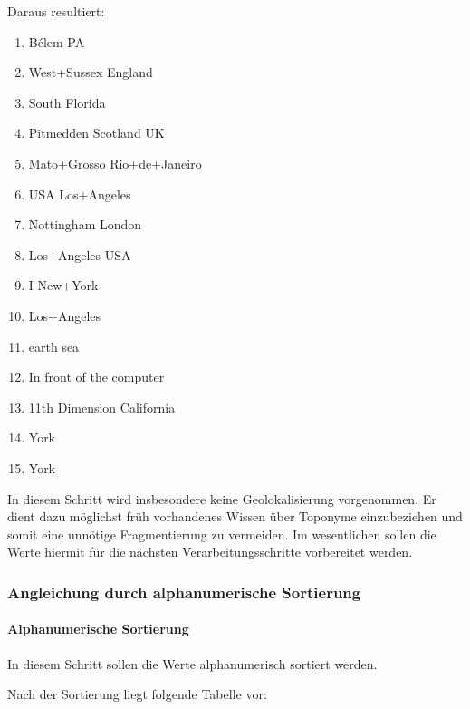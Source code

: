 				Daraus resultiert:

				\begin{multicols}{2}
					\begin{enumerate}
						\item Bélem PA
						\item West+Sussex England
						\item South Florida
						\item Pitmedden Scotland UK
						\item Mato+Grosso Rio+de+Janeiro
						\item USA Los+Angeles
						\item Nottingham London
						\item Los+Angeles USA
						\item I New+York 
						\item Los+Angeles
						\item earth sea
						\item In front of the computer
						\item 11th Dimension California
						\item York
						\item York
					\end{enumerate}
				\end{multicols}

				In diesem Schritt wird insbesondere keine Geolokalisierung vorgenommen. 
				Er dient dazu möglichst früh vorhandenes Wissen über Toponyme einzubeziehen und somit eine unnötige Fragmentierung zu vermeiden.
				Im wesentlichen sollen die Werte hiermit für die nächsten Verarbeitungsschritte vorbereitet werden.

			\subsubsection{Angleichung durch alphanumerische Sortierung}

				\paragraph{Alphanumerische Sortierung}

				In diesem Schritt sollen die Werte alphanumerisch sortiert werden. 

				Nach der Sortierung liegt folgende Tabelle vor:

